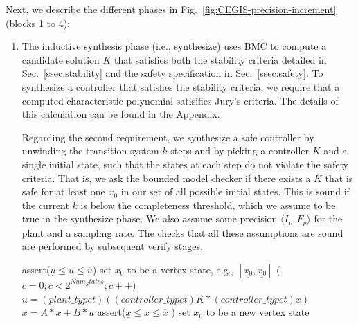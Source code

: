 \documentclass[runningheads,a4paper]{llncs}
\begin{document}
\medskip

Next, we describe the different phases in Fig.~\ref{fig:CEGIS-precision-increment}
(blocks 1 to 4):

\begin{enumerate}
\item The inductive synthesis phase (i.e., {\sc synthesize}) uses BMC to
compute a candidate solution $K$
that satisfies both the stability criteria detailed in 
Sec.~\ref{ssec:stability} and the safety specification in Sec.~\ref{ssec:safety}.
To synthesize a controller that satisfies the stability criteria, we require that
a computed characteristic polynomial satisifies Jury's criteria. The details of this
calculation can be found in the Appendix.

Regarding the second requirement, we synthesize a safe controller by unwinding the transition system
$k$ steps and by picking a controller $K$ and a single initial state,  such that the states at each step do
not violate the safety criteria. That is, we ask the bounded model checker if there exists a $K$ that is safe for at least one $x_0$ in our set of all possible initial states. This is sound if the current $k$ is below the
completeness threshold, which we assume to be true in the {\sc synthesize} phase.
We also assume some
precision $\langle I_p,F_p\rangle$ for the plant and a sampling rate.  The
checks that all these assumptions are sound are performed by subsequent
{\sc verify} stages.



\begin{algorithm}[]
\scriptsize
\begin{algorithmic}[1]
\State assert($ \underline{u}  \leq u \leq \overline{u}$)
 \State set $x_0$ to be a vertex state, e.g., $[\underline{x_0},\underline{x_0}]$	
\For ($c=0; c < 2^{Num_States}; c++$)
		\State $u = (plant\_typet)((controller\_typet)K * (controller\_typet) x)$
		\State $x = A * x + B * u$
		\State assert($\underline{x} \leq x \leq \overline{x}$ )
  	\EndWhile
  	\State set $x_0$ to be a new vertex state
  	\EndFor
\EndFunction
\end{algorithmic}
\label{alg:safetycheck}
\end{algorithm}


\end{enumerate}
\end{document}
